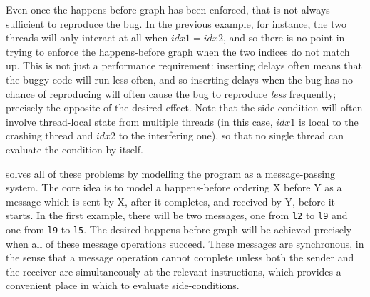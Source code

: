 Even once the happens-before graph has been enforced, that is not
always sufficient to reproduce the bug.  In the previous example, for
instance, the two threads will only interact at all when
$\mathit{idx1} = \mathit{idx2}$, and so there is no point in trying to
enforce the happens-before graph when the two indices do not match up.
This is not just a performance requirement: inserting delays often
means that the buggy code will run less often, and so inserting delays
when the bug has no chance of reproducing will often cause the bug to
reproduce \emph{less} frequently; precisely the opposite of the
desired effect.  Note that the side-condition will often involve
thread-local state from multiple threads (in this case,
$\mathit{idx1}$ is local to the crashing thread and $\mathit{idx2}$ to
the interfering one), so that no single thread can evaluate the
condition by itself.

\Technique{} solves all of these problems by modelling the program as
a message-passing system.  The core idea is to model a happens-before
ordering X before Y as a message which is sent by X, after it
completes, and received by Y, before it starts.  In the first example,
there will be two messages, one from \texttt{l2} to \texttt{l9} and
one from \texttt{l9} to \texttt{l5}.  The desired happens-before graph
will be achieved precisely when all of these message operations
succeed.  These messages are synchronous, in the sense that a message
operation cannot complete unless both the sender and the receiver are
simultaneously at the relevant instructions, which provides a
convenient place in which to evaluate side-conditions.

